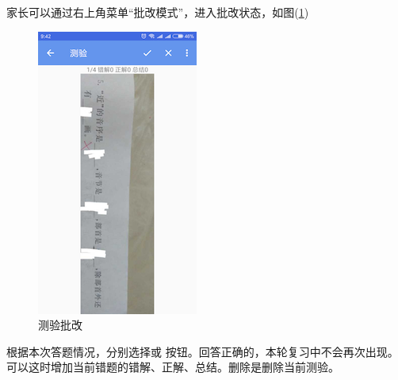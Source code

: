 家长可以通过右上角菜单“批改模式”，进入批改状态，如图(\ref{img36})
\begin{figure}[H]
	\centering
	\includegraphics{img/36.png}
	\caption{测验批改}
	\label{img36}
\end{figure}
根据本次答题情况，分别选择\Checkmark 或 \XSolid 按钮。回答正确的，本轮复习中不会再次出现。可以这时增加当前错题的错解、正解、总结。删除是删除当前测验。

